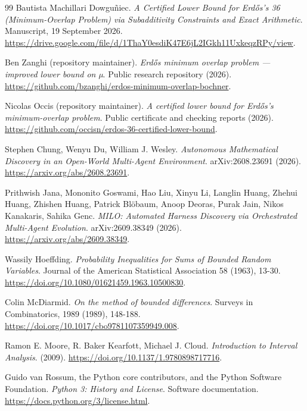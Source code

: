 \begin{thebibliography}{99}
 Bautista Machillari Dowguñiec. \emph{A Certified Lower Bound for Erdős’s 36 (Minimum-Overlap Problem) via Subadditivity Constraints and Exact Arithmetic}. Manuscript, 19 September 2026. \url{https://drive.google.com/file/d/1ThaY0esdiK47E6jL2IGkh11UxkeqzRPy/view}.

 Ben Zanghi (repository maintainer). \emph{Erdős minimum overlap problem — improved lower bound on µ}. Public research repository (2026). \url{https://github.com/bzanghi/erdos-minimum-overlap-bochner}.

 Nicolas Occis (repository maintainer). \emph{A certified lower bound for Erdős’s minimum-overlap problem}. Public certificate and checking reports (2026). \url{https://github.com/occisn/erdos-36-certified-lower-bound}.

 Stephen Chung, Wenyu Du, William J. Wesley. \emph{Autonomous Mathematical Discovery in an Open-World Multi-Agent Environment}. arXiv:2608.23691 (2026). \url{https://arxiv.org/abs/2608.23691}.

 Prithwish Jana, Mononito Goswami, Hao Liu, Xinyu Li, Langlin Huang, Zhehui Huang, Zhishen Huang, Patrick Blöbaum, Anoop Deoras, Purak Jain, Nikos Kanakaris, Sahika Genc. \emph{MILO: Automated Harness Discovery via Orchestrated Multi-Agent Evolution}. arXiv:2609.38349 (2026). \url{https://arxiv.org/abs/2609.38349}.

 Wassily Hoeffding. \emph{Probability Inequalities for Sums of Bounded Random Variables}. Journal of the American Statistical Association 58 (1963), 13-30. \url{https://doi.org/10.1080/01621459.1963.10500830}.

 Colin McDiarmid. \emph{On the method of bounded differences}. Surveys in Combinatorics, 1989  (1989), 148-188. \url{https://doi.org/10.1017/cbo9781107359949.008}.

 Ramon E. Moore, R. Baker Kearfott, Michael J. Cloud. \emph{Introduction to Interval Analysis}.   (2009). \url{https://doi.org/10.1137/1.9780898717716}.

 Guido van Rossum, the Python core contributors, and the Python Software Foundation. \emph{Python 3: History and License}. Software documentation. \url{https://docs.python.org/3/license.html}.

\end{thebibliography}
